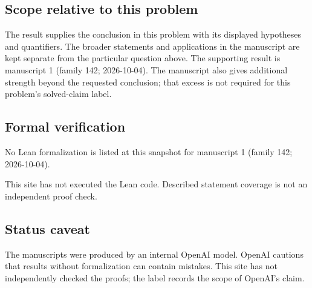 \documentclass[11pt]{article}
\begin{document}
\subsection{Scope relative to this problem}
The result supplies the conclusion in this problem with its displayed hypotheses and quantifiers. The broader statements and applications in the manuscript are kept separate from the particular question above. The supporting result is manuscript 1 (family 142; 2026-10-04). The manuscript also gives additional strength beyond the requested conclusion; that excess is not required for this problem's solved-claim label.

\subsection{Formal verification}
No Lean formalization is listed at this snapshot for manuscript 1 (family 142; 2026-10-04).

This site has not executed the Lean code. Described statement coverage is not an independent proof check.

\subsection{Status caveat}
The manuscripts were produced by an internal OpenAI model. OpenAI cautions that results without formalization can contain mistakes. This site has not independently checked the proofs; the label records the scope of OpenAI's claim.
\end{document}
